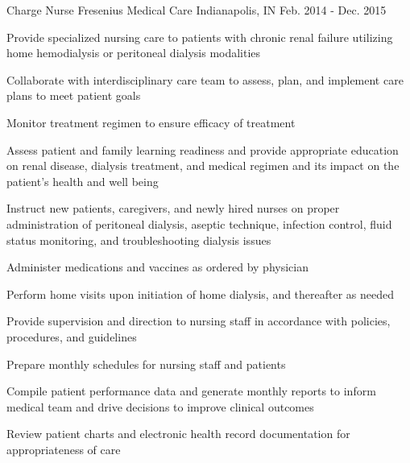 \begin{cventries}
  \cventry
    {Charge Nurse} %
    {Fresenius Medical Care} %
    {Indianapolis, IN} %
    {Feb. 2014 - Dec. 2015} %
    {
      \begin{cvitems} %
        \item {Provide specialized nursing care to patients with chronic renal failure utilizing home hemodialysis or peritoneal dialysis modalities}
        \item {Collaborate with interdisciplinary care team to assess, plan, and implement care plans to meet patient goals}
        \item {Monitor treatment regimen to ensure efficacy of treatment}
        \item {Assess patient and family learning readiness and provide appropriate education on renal disease, dialysis treatment, and medical regimen and its impact on the patient's health and well being}
        \item {Instruct new patients, caregivers, and newly hired nurses on proper administration of peritoneal dialysis, aseptic technique, infection control, fluid status monitoring, and troubleshooting dialysis issues}
        \item {Administer medications and vaccines as ordered by physician}
        \item {Perform home visits upon initiation of home dialysis, and thereafter as needed}
        \item {Provide supervision and direction to nursing staff in accordance with policies, procedures, and guidelines}
        \item {Prepare monthly schedules for nursing staff and patients}
        \item {Compile patient performance data and generate monthly reports to inform medical team and drive decisions to improve clinical outcomes}
        \item {Review patient charts and electronic health record documentation for appropriateness of care}
      \end{cvitems}
    }


\end{cventries}
